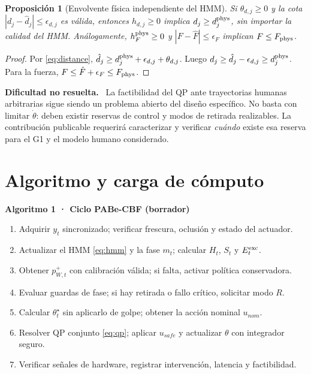 \documentclass[10pt,a4paper,twocolumn]{article}
\newtheorem{proposition}{Proposición}
\newcommand{\subttl}[1]{\vspace{3pt}\noindent\textbf{\color{ink}#1.}~}
\begin{document}
\begin{proposition}[Envolvente física independiente del HMM]
Si $\theta_{d,j}\ge0$ y la cota $|d_j-\hat d_j|\le\epsilon_{d,j}$ es válida, entonces $h_{d,j}\ge0$ implica $d_j\ge d_j^{\rm phys}$, sin importar la calidad del HMM. Análogamente, $h_F^{\rm phys}\ge0$ y $|F-\hat F|\le\epsilon_F$ implican $F\le F_{\rm phys}$.
\end{proposition}
\begin{proof}
Por \eqref{eq:distance}, $\hat d_j\ge d_j^{\rm phys}+\epsilon_{d,j}+\theta_{d,j}$. Luego $d_j\ge\hat d_j-\epsilon_{d,j}\ge d_j^{\rm phys}$. Para la fuerza, $F\le\hat F+\epsilon_F\le F_{\rm phys}$.\qedhere
\end{proof}

\subttl{Dificultad no resuelta} La factibilidad del QP ante trayectorias humanas arbitrarias sigue siendo un problema abierto del diseño específico. No basta con limitar $\dot\theta$: deben existir reservas de control y modos de retirada realizables. La contribución publicable requerirá caracterizar y verificar \emph{cuándo} existe esa reserva para el G1 y el modelo humano considerado.

\section{Algoritmo y carga de cómputo}
\begin{tcolorbox}[colback=papergray,colframe=ink,boxrule=.5pt,left=6pt,right=6pt,top=4pt,bottom=4pt]
\textbf{Algoritmo 1 · Ciclo PABe-CBF (borrador)}
\begin{enumerate}[leftmargin=*,label=\arabic*.,itemsep=1pt]
\item Adquirir $y_t$ sincronizado; verificar frescura, oclusión y estado del actuador.
\item Actualizar el HMM \eqref{eq:hmm} y la fase $m_t$; calcular $H_t$, $S_t$ y $E_t^{\rm exc}$.
\item Obtener $p_{W,t}^+$ con calibración válida; si falta, activar política conservadora.
\item Evaluar guardas de fase; si hay retirada o fallo crítico, solicitar modo $R$.
\item Calcular $\theta_t^\star$ sin aplicarlo de golpe; obtener la acción nominal $u_{nom}$.
\item Resolver QP conjunto \eqref{eq:qp}; aplicar $u_{safe}$ y actualizar $\theta$ con integrador seguro.
\item Verificar señales de hardware, registrar intervención, latencia y factibilidad.
\end{enumerate}
\end{tcolorbox}
\end{document}

